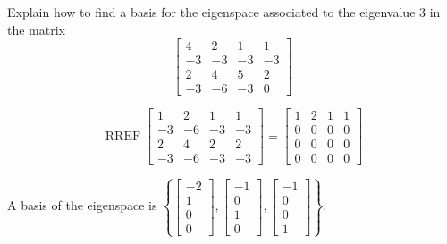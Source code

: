 
\begin{exerciseStatement}


Explain how to find a basis for the eigenspace associated to the eigenvalue \( 3 \) in the matrix \[ \left[\begin{array}{cccc}
4 & 2 & 1 & 1 \\
-3 & -3 & -3 & -3 \\
2 & 4 & 5 & 2 \\
-3 & -6 & -3 & 0
\end{array}\right] \]


\end{exerciseStatement}
    
\begin{exerciseAnswer} 


\[\operatorname{RREF} \left[\begin{array}{cccc}
1 & 2 & 1 & 1 \\
-3 & -6 & -3 & -3 \\
2 & 4 & 2 & 2 \\
-3 & -6 & -3 & -3
\end{array}\right] = \left[\begin{array}{cccc}
1 & 2 & 1 & 1 \\
0 & 0 & 0 & 0 \\
0 & 0 & 0 & 0 \\
0 & 0 & 0 & 0
\end{array}\right] \]



A basis of the eigenspace is \( \left\{ \left[\begin{array}{c}
-2 \\
1 \\
0 \\
0
\end{array}\right] , \left[\begin{array}{c}
-1 \\
0 \\
1 \\
0
\end{array}\right] , \left[\begin{array}{c}
-1 \\
0 \\
0 \\
1
\end{array}\right] \right\} \).


\end{exerciseAnswer}
    
